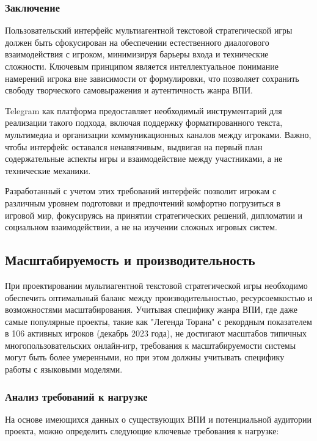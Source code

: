 \subsubsection{Заключение}

Пользовательский интерфейс мультиагентной текстовой стратегической игры должен быть сфокусирован на обеспечении естественного диалогового взаимодействия с игроком, минимизируя барьеры входа и технические сложности. Ключевым принципом является интеллектуальное понимание намерений игрока вне зависимости от формулировки, что позволяет сохранить свободу творческого самовыражения и аутентичность жанра ВПИ.

Telegram как платформа предоставляет необходимый инструментарий для реализации такого подхода, включая поддержку форматированного текста, мультимедиа и организации коммуникационных каналов между игроками. Важно, чтобы интерфейс оставался ненавязчивым, выдвигая на первый план содержательные аспекты игры и взаимодействие между участниками, а не технические механики.

Разработанный с учетом этих требований интерфейс позволит игрокам с различным уровнем подготовки и предпочтений комфортно погрузиться в игровой мир, фокусируясь на принятии стратегических решений, дипломатии и социальном взаимодействии, а не на изучении сложных игровых систем.

\subsection{Масштабируемость и производительность}

При проектировании мультиагентной текстовой стратегической игры необходимо обеспечить оптимальный баланс между производительностью, ресурсоемкостью и возможностями масштабирования. Учитывая специфику жанра ВПИ, где даже самые популярные проекты, такие как "{}Легенда Торана"{} с рекордным показателем в 106 активных игроков (декабрь 2023 года), не достигают масштабов типичных многопользовательских онлайн-игр, требования к масштабируемости системы могут быть более умеренными, но при этом должны учитывать специфику работы с языковыми моделями.

\subsubsection{Анализ требований к нагрузке}

На основе имеющихся данных о существующих ВПИ и потенциальной аудитории проекта, можно определить следующие ключевые требования к нагрузке:


